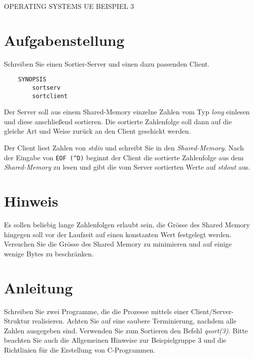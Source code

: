 \documentclass{article}
\begin{document}
\begin{center}
\begin{Large}
OPERATING SYSTEMS UE BEISPIEL 3
\end{Large}
\end{center}

\section*{Aufgabenstellung}

Schreiben Sie einen Sortier-Server und einen dazu passenden Client.
\begin{verbatim}
    SYNOPSIS
        sortserv
        sortclient
\end{verbatim}
Der Server soll aus einem Shared-Memory einzelne Zahlen vom Typ \emph{long} einlesen und
diese anschließend sortieren. Die sortierte Zahlenfolge soll dann auf die gleiche Art und
Weise zur\"uck an den Client geschickt werden.

Der Client liest Zahlen von \emph{stdin} und schreibt Sie in den \emph{Shared-Memory}.
Nach der Eingabe von \verb|EOF (^D)| beginnt der Client die sortierte Zahlenfolge aus dem
\emph{Shared-Memory} zu lesen und gibt die vom Server sortierten Werte auf {\em stdout} aus.

\section*{Hinweis}
Es sollen beliebig lange Zahlenfolgen erlaubt sein, die Gr\"osse des Shared Memory hingegen soll vor der Laufzeit auf einen konstanten Wert festgelegt werden. Versuchen Sie die Gr\"osse des Shared Memory zu minimieren und auf einige wenige Bytes zu beschr\"anken.

\section*{Anleitung}
Schreiben Sie zwei Programme, die die Prozesse mittels einer Client/Server-Struktur realisieren. Achten Sie auf eine saubere Terminierung, nachdem alle Zahlen ausgegeben sind. Verwenden Sie zum Sortieren den Befehl \emph{qsort(3)}.
Bitte beachten Sie auch die Allgemeinen Hinweise zur Beispielgruppe 3 und die Richtlinien
für die Erstellung von C-Programmen.
\end{document}
